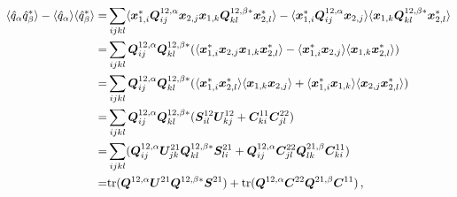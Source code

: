 \documentclass[12pt,a4paper]{article}
\begin{document}
\begin{align}
\langle \hat{q}_\alpha \hat{q}_\beta^*\rangle - \langle \hat{q}_\alpha\rangle \langle \hat{q}_\beta^*\rangle =&
\sum_{ijkl}\langle \bm{x}_{1,i}^*\bm{Q}^{12,\alpha}_{ij}\bm{x}_{2,j}\bm{x}_{1,k}\bm{Q}^{12,\beta*}_{kl}\bm{x}_{2,l}^*\rangle - \langle \bm{x}_{1,i}^*\bm{Q}^{12,\alpha}_{ij}\bm{x}_{2,j}\rangle\langle \bm{x}_{1,k}\bm{Q}^{12,\beta*}_{kl}\bm{x}_{2,l}^*\rangle\notag\\
=&\sum_{ijkl} \bm{Q}^{12,\alpha}_{ij}\bm{Q}^{12,\beta*}_{kl}(\langle \bm{x}_{1,i}^*\bm{x}_{2,j}\bm{x}_{1,k}\bm{x}_{2,l}^*\rangle - \langle \bm{x}_{1,i}^*\bm{x}_{2,j}\rangle\langle \bm{x}_{1,k}\bm{x}_{2,l}^*\rangle)\notag\\
=&\sum_{ijkl}  \bm{Q}^{12,\alpha}_{ij}\bm{Q}^{12,\beta*}_{kl}(\langle \bm{x}_{1,i}^*\bm{x}_{2,l}^*\rangle \langle \bm{x}_{1,k}\bm{x}_{2,j}\rangle + \langle \bm{x}_{1,i}^*\bm{x}_{1,k}\rangle\langle \bm{x}_{2,j}\bm{x}_{2,l}^*\rangle)\notag\\
=&\sum_{ijkl} \bm{Q}^{12,\alpha}_{ij}\bm{Q}^{12,\beta*}_{kl} ( \bm{S}_{il}^{12}\bm{U}_{kj}^{12} + \bm{C}^{11}_{ki}\bm{C}^{22}_{jl})\notag\\
=&\sum_{ijkl}( \bm{Q}^{12,\alpha}_{ij}\bm{U}_{jk}^{21}\bm{Q}^{12,\beta*}_{kl} \bm{S}_{li}^{21} + \bm{Q}^{12,\alpha}_{ij}\bm{C}^{22}_{jl} \bm{Q}^{21,\beta}_{lk} \bm{C}^{11}_{ki} ) \notag\\
=&\text{tr}(\bm{Q}^{12,\alpha} \bm{U}^{21} \bm{Q}^{12,\beta *} \bm{S}^{21}) + \text{tr}(\bm{Q}^{12,\alpha} \bm{C}^{22} \bm{Q}^{21,\beta} \bm{C}^{11}) \,,
\end{align}
\end{document}
